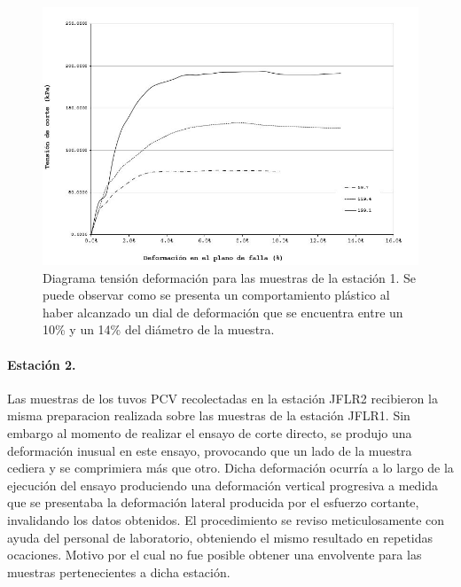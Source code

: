\begin{figure}[H]
\centering
\includegraphics[scale=1]{img/diagramatd.JPG}
\caption{Diagrama tensi\'on deformaci\'on para las muestras de la estaci\'on 1. Se puede observar como se presenta un comportamiento pl\'astico al haber alcanzado un dial de deformaci\'on que se encuentra entre un   10\% y un 14\% del di\'ametro de la muestra.}
\label{fig:toma-bloque}
\end{figure}


\paragraph{Estaci\'on 2.}
Las muestras de los tuvos PCV recolectadas en la estaci\'on JFLR2 recibieron la misma preparacion realizada sobre las muestras de la estaci\'on JFLR1. Sin embargo al momento de realizar el ensayo de corte directo, se produjo una deformaci\'on inusual en este ensayo, provocando que un lado de la muestra cediera y se comprimiera m\'as que otro. Dicha deformaci\'on ocurr\'ia a lo largo de la ejecuci\'on del ensayo produciendo una deformaci\'on vertical progresiva a medida que se presentaba la deformaci\'on lateral producida por el esfuerzo cortante, invalidando los datos obtenidos. El procedimiento se reviso meticulosamente con ayuda del personal de laboratorio, obteniendo el mismo resultado en repetidas ocaciones. Motivo por el cual no fue posible obtener una envolvente para las muestras pertenecientes a dicha estaci\'on.


